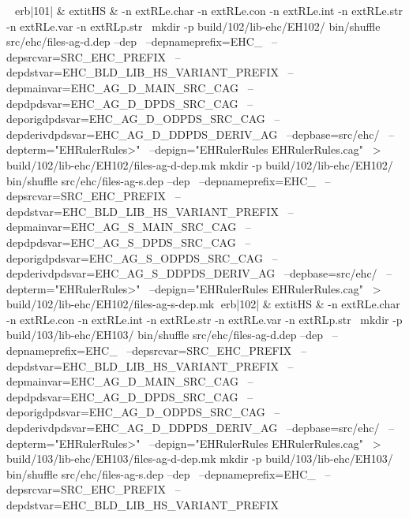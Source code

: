 \
erb|101| & 	extit{HS} & 
-n 	extRL{e.char}\hspace{.5em} 
-n 	extRL{e.con}\hspace{.5em} 
-n 	extRL{e.int}\hspace{.5em} 
-n 	extRL{e.str}\hspace{.5em} 
-n 	extRL{e.var}\hspace{.5em} 
-n 	extRL{p.str}\hspace{.5em} 
\
mkdir -p build/102/lib-ehc/EH102/
bin/shuffle src/ehc/files-ag-d.dep --dep \
	  --depnameprefix=EHC_ \
	  --depsrcvar=SRC_EHC_PREFIX \
	  --depdstvar=EHC_BLD_LIB_HS_VARIANT_PREFIX \
	  --depmainvar=EHC_AG_D_MAIN_SRC_CAG \
	  --depdpdsvar=EHC_AG_D_DPDS_SRC_CAG \
	  --deporigdpdsvar=EHC_AG_D_ODPDS_SRC_CAG \
	  --depderivdpdsvar=EHC_AG_D_DDPDS_DERIV_AG \
	  --depbase=src/ehc/ \
	  --depterm="EHRulerRules>" \
	  --depign="EHRulerRules EHRulerRules.cag" \
	    > build/102/lib-ehc/EH102/files-ag-d-dep.mk
mkdir -p build/102/lib-ehc/EH102/
bin/shuffle src/ehc/files-ag-s.dep --dep \
	  --depnameprefix=EHC_ \
	  --depsrcvar=SRC_EHC_PREFIX \
	  --depdstvar=EHC_BLD_LIB_HS_VARIANT_PREFIX \
	  --depmainvar=EHC_AG_S_MAIN_SRC_CAG \
	  --depdpdsvar=EHC_AG_S_DPDS_SRC_CAG \
	  --deporigdpdsvar=EHC_AG_S_ODPDS_SRC_CAG \
	  --depderivdpdsvar=EHC_AG_S_DDPDS_DERIV_AG \
	  --depbase=src/ehc/ \
	  --depterm="EHRulerRules>" \
	  --depign="EHRulerRules EHRulerRules.cag" \
	    > build/102/lib-ehc/EH102/files-ag-s-dep.mk
erb|102| & 	extit{HS} & 
-n 	extRL{e.char}\hspace{.5em} 
-n 	extRL{e.con}\hspace{.5em} 
-n 	extRL{e.int}\hspace{.5em} 
-n 	extRL{e.str}\hspace{.5em} 
-n 	extRL{e.var}\hspace{.5em} 
-n 	extRL{p.str}\hspace{.5em} 
\
mkdir -p build/103/lib-ehc/EH103/
bin/shuffle src/ehc/files-ag-d.dep --dep \
	  --depnameprefix=EHC_ \
	  --depsrcvar=SRC_EHC_PREFIX \
	  --depdstvar=EHC_BLD_LIB_HS_VARIANT_PREFIX \
	  --depmainvar=EHC_AG_D_MAIN_SRC_CAG \
	  --depdpdsvar=EHC_AG_D_DPDS_SRC_CAG \
	  --deporigdpdsvar=EHC_AG_D_ODPDS_SRC_CAG \
	  --depderivdpdsvar=EHC_AG_D_DDPDS_DERIV_AG \
	  --depbase=src/ehc/ \
	  --depterm="EHRulerRules>" \
	  --depign="EHRulerRules EHRulerRules.cag" \
	    > build/103/lib-ehc/EH103/files-ag-d-dep.mk
mkdir -p build/103/lib-ehc/EH103/
bin/shuffle src/ehc/files-ag-s.dep --dep \
	  --depnameprefix=EHC_ \
	  --depsrcvar=SRC_EHC_PREFIX \
	  --depdstvar=EHC_BLD_LIB_HS_VARIANT_PREFIX \
